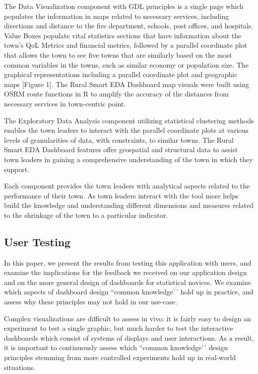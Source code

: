 \documentclass[letterpaper,inpress]{jdsart}
\begin{document}
The Data Visualization component with GDL principles is a single page which populates the information in maps related to necessary services, including directions and distance to the fire department, schools, post offices, and hospitals. Value Boxes populate vital statistics sections that have information about the town's QoL Metrics and financial metrics, followed by a parallel coordinate plot that allows the town to see five towns that are similarly based on the most common variables in the towns, such as similar economy or population size. The graphical representations including a parallel coordinate plot and geographic maps {[}Figure 1{]}. The Rural Smart EDA Dashboard map visuals were built using OSRM route functions in R to amplify the accuracy of the distances from necessary services in town-centric point.

The Exploratory Data Analysis component utilizing statistical clustering methods enables the town leaders to interact with the parallel coordinate plots at various levels of granularities of data, with constraints, to similar towns. The Rural Smart EDA Dashboard features offer geospatial and structural data to assist town leaders in gaining a comprehensive understanding of the town in which they support.

Each component provides the town leaders with analytical aspects related to the performance of their town. As town leaders interact with the tool more helps build the knowledge and understanding different dimensions and measures related to the shrinkage of the town to a particular indicator.

\subsection{User Testing}

In this paper, we present the results from testing this application with users, and examine the implications for the feedback we received on our application design and on the more general design of dashboards for statistical novices. We examine which aspects of dashboard design ``common knowledge'\,' hold up in practice, and assess why these principles may not hold in our use-case.

Complex visualizations are difficult to assess in vivo: it is fairly easy to design an experiment to test a single graphic, but much harder to test the interactive dashboards which consist of systems of displays and user interactions. As a result, it is important to continuously assess which ``common knowledge'\,' design principles stemming from more controlled experiments hold up in real-world situations.
\end{document}
